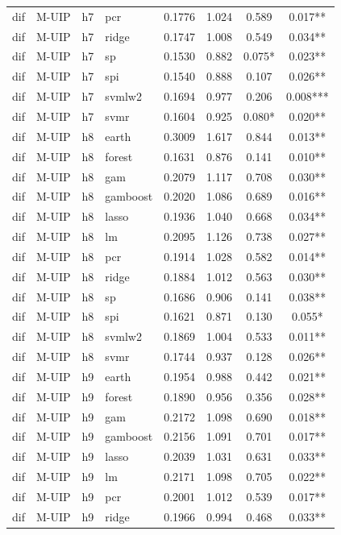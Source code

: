 \begin{ThreePartTable}
\begin{longtable}[t]{llclcccc}
dif & M-UIP & h7 & pcr & 0.1776 & 1.024 & 0.589 & 0.017**\\
dif & M-UIP & h7 & ridge & 0.1747 & 1.008 & 0.549 & 0.034**\\
dif & M-UIP & h7 & sp & 0.1530 & 0.882 & 0.075* & 0.023**\\
dif & M-UIP & h7 & spi & 0.1540 & 0.888 & 0.107 & 0.026**\\
dif & M-UIP & h7 & svmlw2 & 0.1694 & 0.977 & 0.206 & 0.008***\\
dif & M-UIP & h7 & svmr & 0.1604 & 0.925 & 0.080* & 0.020**\\
\addlinespace
dif & M-UIP & h8 & earth & 0.3009 & 1.617 & 0.844 & 0.013**\\
dif & M-UIP & h8 & forest & 0.1631 & 0.876 & 0.141 & 0.010**\\
dif & M-UIP & h8 & gam & 0.2079 & 1.117 & 0.708 & 0.030**\\
dif & M-UIP & h8 & gamboost & 0.2020 & 1.086 & 0.689 & 0.016**\\
dif & M-UIP & h8 & lasso & 0.1936 & 1.040 & 0.668 & 0.034**\\
dif & M-UIP & h8 & lm & 0.2095 & 1.126 & 0.738 & 0.027**\\
dif & M-UIP & h8 & pcr & 0.1914 & 1.028 & 0.582 & 0.014**\\
dif & M-UIP & h8 & ridge & 0.1884 & 1.012 & 0.563 & 0.030**\\
dif & M-UIP & h8 & sp & 0.1686 & 0.906 & 0.141 & 0.038**\\
dif & M-UIP & h8 & spi & 0.1621 & 0.871 & 0.130 & 0.055*\\
dif & M-UIP & h8 & svmlw2 & 0.1869 & 1.004 & 0.533 & 0.011**\\
dif & M-UIP & h8 & svmr & 0.1744 & 0.937 & 0.128 & 0.026**\\
\addlinespace
dif & M-UIP & h9 & earth & 0.1954 & 0.988 & 0.442 & 0.021**\\
dif & M-UIP & h9 & forest & 0.1890 & 0.956 & 0.356 & 0.028**\\
dif & M-UIP & h9 & gam & 0.2172 & 1.098 & 0.690 & 0.018**\\
dif & M-UIP & h9 & gamboost & 0.2156 & 1.091 & 0.701 & 0.017**\\
dif & M-UIP & h9 & lasso & 0.2039 & 1.031 & 0.631 & 0.033**\\
dif & M-UIP & h9 & lm & 0.2171 & 1.098 & 0.705 & 0.022**\\
dif & M-UIP & h9 & pcr & 0.2001 & 1.012 & 0.539 & 0.017**\\
dif & M-UIP & h9 & ridge & 0.1966 & 0.994 & 0.468 & 0.033**\\

\end{longtable}
\end{ThreePartTable}
